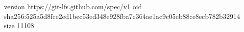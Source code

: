 version https://git-lfs.github.com/spec/v1
oid sha256:525a5d8fce2ed1bec53ed348e928fba7c364ae1ac9c05eb88ce8ecb782b32914
size 11108
